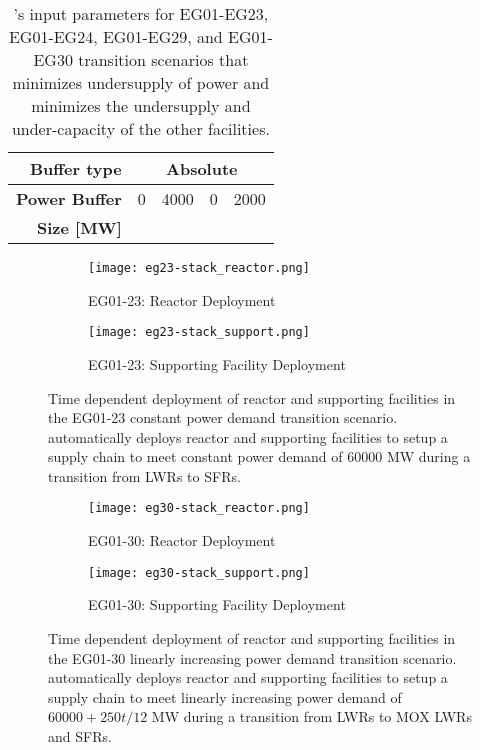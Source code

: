 \begin{table}[]
\begin{tabular}{r|cccc}
	\textbf{Buffer type}                                                    & \multicolumn{4}{c}{Absolute}                                                                                                                                                                                                                                                               \\ \hline
	\textbf{Power Buffer}                                                  & 0 & 4000 & 0 & 2000 \\ 
	\textbf{Size [MW]} \\ \hline \end{tabular}
	\caption{\deploy's input parameters for EG01-EG23, EG01-EG24, EG01-EG29, and 
	EG01-EG30 transition scenarios
	that minimizes undersupply of power and minimizes 
	the undersupply and under-capacity of the other facilities. }
	\label{tab:bestinputs}
	\end{table}

\begin{figure}[]
	\centering
	\begin{subfigure}[t]{1.2\textwidth}
		\centering
		\texttt{[image: eg23-stack\_reactor.png]} 
		\caption{EG01-23: Reactor Deployment}
		\label{fig:23reactor}
	\end{subfigure}
	\vspace{1cm}
	\begin{subfigure}[t]{1.2\textwidth}
		\centering
		\texttt{[image: eg23-stack\_support.png]} 
		\caption{EG01-23: Supporting Facility Deployment}
		\label{fig:23support}
	\end{subfigure}
	\hfill
	\caption{Time dependent deployment of reactor and supporting facilities in 
	the EG01-23 constant power demand transition scenario. 
	\deploy automatically deploys reactor and supporting facilities 
	to setup a supply chain to meet constant power demand of $60000$ MW
	during a transition from \glspl{LWR} to \glspl{SFR}. }
	\label{fig:23stack}
\end{figure}

\begin{figure}[]
	\centering
	\begin{subfigure}[t]{1.2\textwidth}
		\centering
		\texttt{[image: eg30-stack\_reactor.png]} 
		\caption{EG01-30: Reactor Deployment}
		\label{fig:30reactor}
	\end{subfigure}
	\vspace{1cm}
	\begin{subfigure}[t]{1.2\textwidth}
		\centering
		\texttt{[image: eg30-stack\_support.png]} 
		\caption{EG01-30: Supporting Facility Deployment}
		\label{fig:30support}
	\end{subfigure}
	\hfill
	\caption{Time dependent deployment of reactor and supporting facilities in 
	the EG01-30 linearly increasing power demand transition scenario. 
	\deploy automatically deploys reactor and supporting facilities 
	to setup a supply chain to meet linearly increasing power demand of $60000 + 250t/12$ MW
	during a transition from \glspl{LWR} to MOX LWRs and \glspl{SFR}. }
	\label{fig:30stack}
\end{figure}

